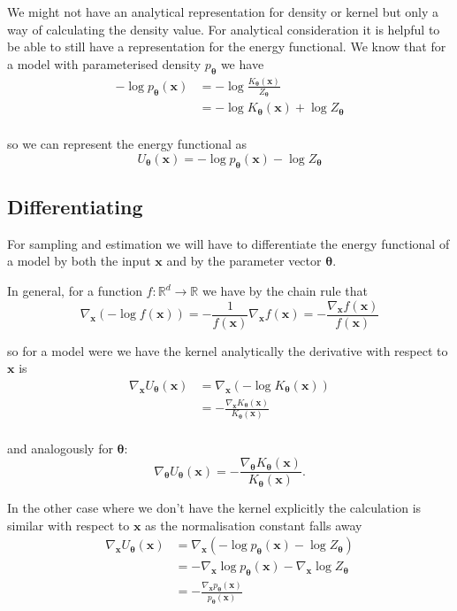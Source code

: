 We might not have an analytical representation for density or kernel but only a way of calculating the density value.
For analytical consideration it is helpful to be able to still have a representation for the energy functional.
We know that for a model with parameterised density $p_{\bm{\theta}}$ we have
\[
\begin{aligned}
	- \log p_{\bm{\theta}} (\bm{x}) 
	&= - \log \frac{ K_{\bm{\theta}} (\bm{x}) }{ Z_{\bm{\theta}} } \\
	&= - \log K_{\bm{\theta}} (\bm{x}) + \log Z_{\bm{\theta}}  \\
\end{aligned}
\]

so we can represent the energy functional as
\[
	U_{\bm{\theta}} (\bm{x}) = - \log p_{\bm{\theta}} (\bm{x}) - \log Z_{\bm{\theta}}
\]



\subsection{Differentiating}
For sampling and estimation we will have to differentiate the energy functional of a model by both the input $\bm{x}$ and by the parameter vector $\bm{\theta}$.

In general, for a function $f : \mathbb{R}^d \to \mathbb{R}$ we have by the chain rule that
\[
	\nabla_{\bm{x}} (- \log f(\bm{x}) ) = - \frac{ 1 }{ f(\bm{x}) } \nabla_{\bm{x}} f(\bm{x}) = - \frac{ \nabla_{\bm{x}} f(\bm{x}) }{ f(\bm{x}) } 
\]

so for a model were we have the kernel analytically the derivative with respect to $\bm{x}$ is
\[
\begin{aligned}
	\nabla_{\bm{x}} U_{\bm{\theta}} (\bm{x})
	&= \nabla_{\bm{x}} ( - \log K_{\bm{\theta}} (\bm{x}) ) \\
	&= - \frac{ \nabla_{\bm{x}} K_{\bm{\theta}} (\bm{x}) }{ K_{\bm{\theta}} (\bm{x}) }   \\
\end{aligned}
\]

and analogously for $\bm{\theta}$:
\[
	\nabla_{\bm{\theta}} U_{\bm{\theta}} (\bm{x}) = - \frac{ \nabla_{\bm{\theta}} K_{\bm{\theta}} (\bm{x}) }{ K_{\bm{\theta}} (\bm{x}) }.
\]

In the other case where we don't have the kernel explicitly the calculation is similar with respect to $\bm{x}$ as the normalisation constant falls away
\[
\begin{aligned}
	\nabla_{\bm{x}} U_{\bm{\theta}} (\bm{x})
	&= \nabla_{\bm{x}} ( - \log p_{\bm{\theta}} (\bm{x}) - \log Z_{\bm{\theta}} ) \\
	&=  - \nabla_{\bm{x}} \log p_{\bm{\theta}} (\bm{x}) - \nabla_{\bm{x}} \log Z_{\bm{\theta}} \\
	&= - \frac{ \nabla_{\bm{x}} p_{\bm{\theta}} (\bm{x}) }{ p_{\bm{\theta}} (\bm{x}) }  \\
\end{aligned}
\]

